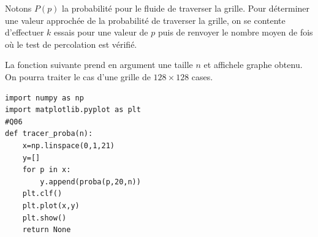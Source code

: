 \documentclass[t,10pt]{article}
\begin{document}

Notons $P(p)$ la probabilité pour le fluide de traverser la grille. Pour déterminer une valeur approchée de la probabilité de traverser la grille, on se contente d'effectuer $k$ essais pour une valeur de $p$ puis de renvoyer le nombre moyen de fois où le test de percolation est vérifié.





La fonction suivante prend en argument une taille $n$ et affichele graphe obtenu. On pourra traiter le 
cas d'une grille de $128\times 128$ cases.%

\begin{lstlisting}
import numpy as np
import matplotlib.pyplot as plt
#Q06
def tracer_proba(n):
    x=np.linspace(0,1,21)
    y=[]
    for p in x:
        y.append(proba(p,20,n))
    plt.clf()
    plt.plot(x,y)
    plt.show()
    return None
\end{lstlisting}
\end{document}

